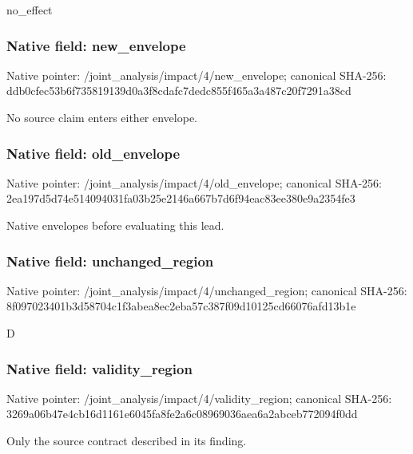 \documentclass[10pt,a4paper]{article}
\begin{document}
\begingroup\raggedright\sloppy no\_\allowbreak{}effect\par\endgroup

\subsubsection{Native field: new\_\allowbreak{}envelope}
Native pointer: /joint\_\allowbreak{}analysis/impact/4/new\_\allowbreak{}envelope; canonical SHA-256: ddb0cfec53b6f735819139d0a3f8cdafc7dedc855f465a3a487c20f7291a38cd

\begingroup\raggedright\sloppy No source claim enters either envelope.\par\endgroup

\subsubsection{Native field: old\_\allowbreak{}envelope}
Native pointer: /joint\_\allowbreak{}analysis/impact/4/old\_\allowbreak{}envelope; canonical SHA-256: 2ea197d5d74e514094031fa03b25e2146a667b7d6f94eac83ee380e9a2354fe3

\begingroup\raggedright\sloppy Native envelopes before evaluating this lead.\par\endgroup

\subsubsection{Native field: unchanged\_\allowbreak{}region}
Native pointer: /joint\_\allowbreak{}analysis/impact/4/unchanged\_\allowbreak{}region; canonical SHA-256: 8f097023401b3d58704c1f3abea8ec2eba57c387f09d10125cd66076afd13b1e

\begingroup\raggedright\sloppy D\par\endgroup

\subsubsection{Native field: validity\_\allowbreak{}region}
Native pointer: /joint\_\allowbreak{}analysis/impact/4/validity\_\allowbreak{}region; canonical SHA-256: 3269a06b47e4cb16d1161e6045fa8fe2a6c08969036aea6a2abceb772094f0dd

\begingroup\raggedright\sloppy Only the source contract described in its finding.\par\endgroup
\end{document}
